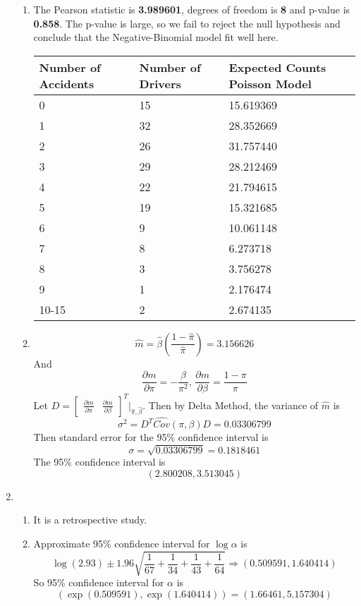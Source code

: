 \documentclass{article}
\begin{document}
\begin{enumerate}[leftmargin = 0 em, label = \arabic*., font = \bfseries]
\begin{enumerate}
		\item 
		The Pearson statistic is \textbf{ 3.989601}, degrees of freedom is \textbf{8} and p-value is \textbf{0.858}. The p-value is large, so we fail to reject the null hypothesis and conclude that the Negative-Binomial model fit well here. 
		\begin{center}
			\begin{tabularx}{0.8\textwidth}{p{0.3\textwidth}p{}X}
      	\toprule
			\textbf{Number of Accidents} & \textbf{Number of Drivers}&\textbf{Expected Counts Poisson Model}\\
			\midrule		
          0 &  15 & 15.619369\\
          1 &  32 & 28.352669\\
          2 &  26 & 31.757440\\
          3 &  29 & 28.212469\\
          4 &  22 & 21.794615\\
          5 &  19 & 15.321685\\
          6 &   9 & 10.061148\\
          7 &   8 &  6.273718\\
          8 &   3 &  3.756278\\
          9 &   1 &  2.176474\\
      10-15 &   2 &  2.674135\\
       \bottomrule
      			\end{tabularx}
		\end{center}

		\newpage
		\item 
		\[\hat{m} = \hat{\beta} \left(\frac{1 - \hat{\pi}}{\hat{\pi}}\right) = 3.156626\]
		And 
		\[\frac{\partial m}{\partial \pi} = -\frac{\beta}{\pi^2},\, \frac{\partial m}{\partial \beta} = \frac{1 - \pi}{\pi}\]
		Let $D = \begin{bmatrix}
			\frac{\partial m}{\partial \pi}& \frac{\partial m}{\partial \beta}
		\end{bmatrix}^T\bigg|_{\hat{\pi}, \hat{\beta}}$. Then by Delta Method, the variance of $\hat{m}$ is 
		\[\sigma^2 = D^T \widehat{Cov}(\pi, \beta)D = 0.03306799 \]
		Then standard error for the 95\% confidence interval is
		\[\sigma = \sqrt{0.03306799} = 0.1818461\]
		The 95\% confidence interval is
		\[(2.800208, 3.513045)\]

	\end{enumerate}

	\item 
	\begin{enumerate}
		\item 
		It is a retrospective study.
		\item 
		Approximate 95\% confidence interval for $\log \alpha$ is 
		\[\log(2.93) \pm 1.96 \sqrt{\frac{1}{67} + \frac{1}{34} + \frac{1}{43} + \frac{1}{64}} \Rightarrow (0.509591, 1.640414)\]
		So 95\% confidence interval for $\alpha$ is
		\[(\exp(0.509591), \exp(1.640414)) = (1.66461, 5.157304)\]


\end{enumerate}
\end{enumerate}
\end{document}

